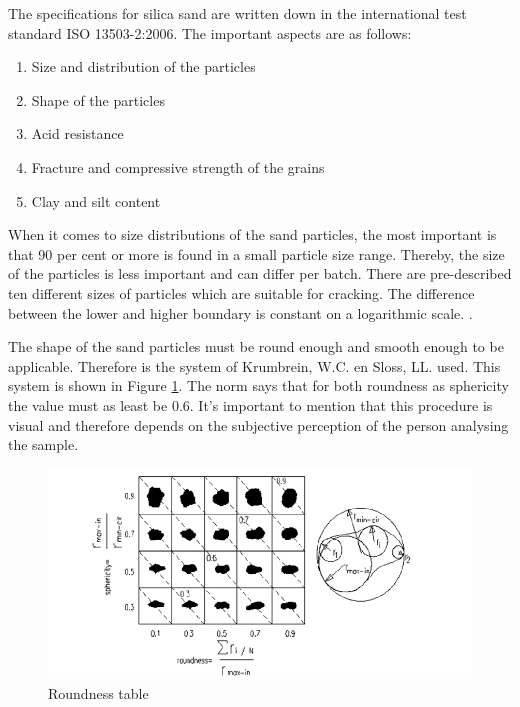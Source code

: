 The specifications for silica sand are written down in the international test standard ISO 13503-2:2006. The important aspects are as follows:

\begin{enumerate}
    \item  Size and distribution of the particles
    \item Shape of the particles
    \item Acid resistance 
    \item Fracture and compressive strength of the grains
    \item Clay and silt content
\end{enumerate}

When it comes to size distributions of the sand particles, the most important is that 90 per cent or more is found in a small particle size range. Thereby, the size of the particles is less important and can differ per batch. There are pre-described ten different sizes of particles which are suitable for cracking. The difference between the lower and higher boundary is constant on a logarithmic scale. \autocite{bensonFracSandUnited2015}. 

The shape of the sand particles must be round enough and smooth enough to be applicable. Therefore is the system of Krumbrein, W.C. en Sloss, LL. used. This system is shown in Figure \ref{fig:RT}. The norm says that for both roundness as sphericity the value must as least be 0.6. It's important to mention that this procedure is visual and therefore depends on the subjective perception of the person analysing the sample.

\begin{figure}[H]
    \centering
    \includegraphics[width=0.75\linewidth]{figures//ch9/roundness.png}
    \caption{Roundness table \autocite{rodriguezParticleShapeQuantities2013}}
    \label{fig:RT}
\end{figure}

